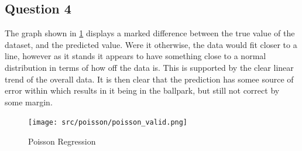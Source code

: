 \documentclass{article}
\begin{document}
\subsection{}

\subsection{Question 4}
The graph shown in \ref{fig:Poisson} displays a marked difference between the 
true value of the dataset, and the predicted value. 
Were it otherwise, the data would fit closer to a line, however as it stands
it appears to have something close to a normal distribution in terms of how off
the data is. 
This is supported by the clear linear trend of the overall data. 
It is then clear that the prediction has somee source of error within which 
results in it being in the ballpark, but still not correct by some margin. 
\begin{figure}[H]
	\centering
	\texttt{[image: src/poisson/poisson\_valid.png]}
	\caption{Poisson Regression}
	\label{fig:Poisson}
\end{figure}
\end{document}

